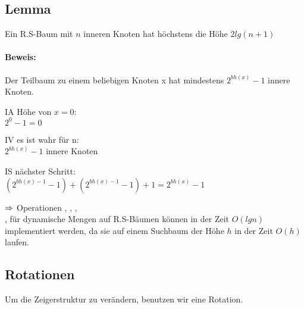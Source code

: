 \documentclass[a4paper,twoside,DIV15,BCOR12mm]{scrbook}
\begin{document}
\subsection*{Lemma}

Ein R.S-Baum mit $n$ inneren Knoten hat höchstens die Höhe $2lg(n+1)$

\paragraph{Beweis:}

Der Teilbaum zu einem beliebigen Knoten x hat mindestens $2^{bh(x)}-1$ innere Knoten.
\begin{description}
\item{IA} Höhe von $x=0$: \\
$2^0-1=0$
\item{IV} es ist wahr für n: \\
$2^{bh(x)}-1$ innere Knoten
\item{IS} nächster Schritt: \\
$(2^{bh(x)-1}-1)+(2^{bh(x)-1}-1)+1=2^{bh(x)}-1$
\end{description}

$\Rightarrow$ Operationen , , , \\
,  für dynamische Mengen auf R.S-Bäumen können in der Zeit $O(lgn)$ implementiert werden, 
da sie auf einem Suchbaum der Höhe $h$ in der Zeit $O(h)$ laufen.

\subsection{Rotationen}

Um die Zeigerstruktur zu verändern, benutzen wir eine Rotation.


\end{document}
